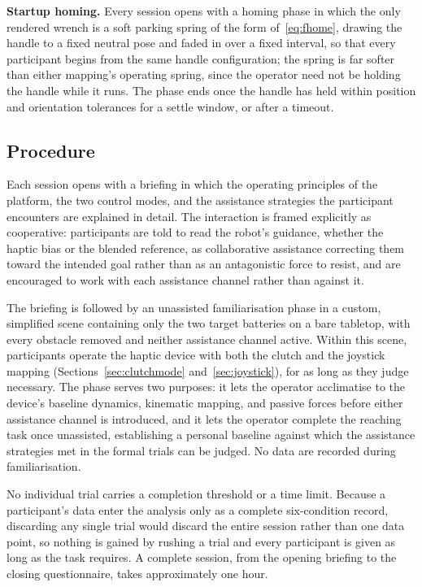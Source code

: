 \textbf{Startup homing.}
\label{sec:homing}
Every session opens with a homing phase in which the only rendered wrench is a soft parking spring of the form of~\eqref{eq:fhome}, drawing the handle to a fixed neutral pose and faded in over a fixed interval, so that every participant begins from the same handle configuration; the spring is far softer than either mapping's operating spring, since the operator need not be holding the handle while it runs. The phase ends once the handle has held within position and orientation tolerances for a settle window, or after a timeout.

\subsection{Procedure}
\label{sec:studyprocedure}

Each session opens with a briefing in which the operating principles of the platform, the two control modes, and the assistance strategies the participant encounters are explained in detail. The interaction is framed explicitly as cooperative: participants are told to read the robot's guidance, whether the haptic bias or the blended reference, as collaborative assistance correcting them toward the intended goal rather than as an antagonistic force to resist, and are encouraged to work with each assistance channel rather than against it.

The briefing is followed by an unassisted familiarisation phase in a custom, simplified scene containing only the two target batteries on a bare tabletop, with every obstacle removed and neither assistance channel active. Within this scene, participants operate the haptic device with both the clutch and the joystick mapping (Sections~\ref{sec:clutchmode} and~\ref{sec:joystick}), for as long as they judge necessary. The phase serves two purposes: it lets the operator acclimatise to the device's baseline dynamics, kinematic mapping, and passive forces before either assistance channel is introduced, and it lets the operator complete the reaching task once unassisted, establishing a personal baseline against which the assistance strategies met in the formal trials can be judged. No data are recorded during familiarisation.

No individual trial carries a completion threshold or a time limit. Because a participant's data enter the analysis only as a complete six-condition record, discarding any single trial would discard the entire session rather than one data point, so nothing is gained by rushing a trial and every participant is given as long as the task requires. A complete session, from the opening briefing to the closing questionnaire, takes approximately one hour.

